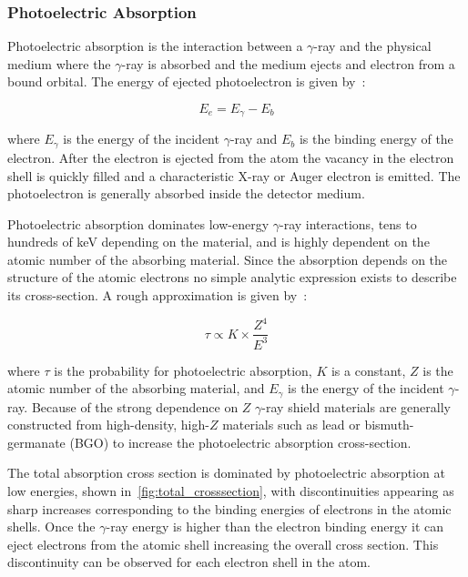 \documentclass[cnatzke_thesis_proposal.tex]{subfiles}
\begin{document}
\subsubsection{Photoelectric Absorption}
Photoelectric absorption is the interaction between a $\gamma$-ray and the physical medium where the $\gamma$-ray is absorbed and the medium ejects and electron from a bound orbital. The energy of ejected photoelectron is given by~\cite{krane_introductory_1987}: 

\begin{equation}
    E_e = E_\gamma - E_b
\end{equation}

where $E_\gamma$ is the energy of the incident $\gamma$-ray and $E_b$ is the binding energy of the electron. After the electron is ejected from the atom the vacancy in the electron shell is quickly filled and a characteristic X-ray or Auger electron is emitted. The photoelectron is generally absorbed inside the detector medium.

Photoelectric absorption dominates low-energy $\gamma$-ray interactions, tens to hundreds of keV depending on the material, and is highly dependent on the atomic number of the absorbing material. Since the absorption depends on the structure of the atomic electrons no simple analytic expression exists to describe its cross-section. A rough approximation is given by~\cite{krane_introductory_1987}: 

\begin{equation}
    \tau \propto K \times \frac{Z^4}{E^{3}}
\end{equation}

where $\tau$ is the probability for photoelectric absorption, $K$ is a constant, $Z$ is the atomic number of the absorbing material, and $E_\gamma$ is the energy of the incident $\gamma$-ray. Because of the strong dependence on $Z$ $\gamma$-ray shield materials are generally constructed from high-density, high-$Z$ materials such as lead or bismuth-germanate (BGO) to increase the photoelectric absorption cross-section.

The total absorption cross section is dominated by photoelectric absorption at low energies, shown in~\ref{fig:total_crosssection}, with discontinuities appearing as sharp increases corresponding to the binding energies of electrons in the atomic shells. Once the $\gamma$-ray energy is higher than the electron binding energy it can eject electrons from the atomic shell increasing the overall cross section. This discontinuity can be observed for each electron shell in the atom.
\end{document}
